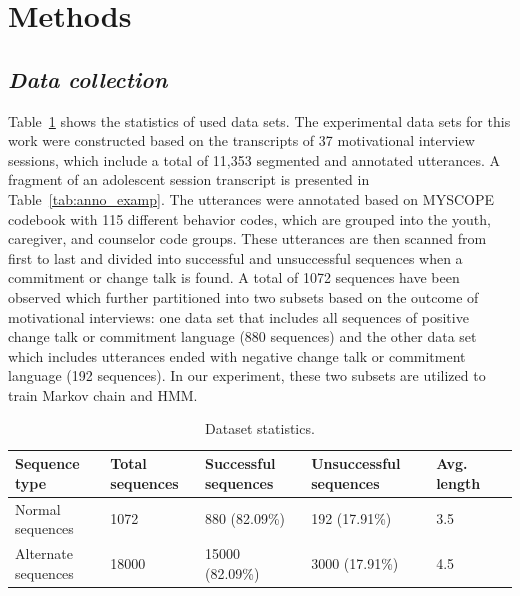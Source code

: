 \documentclass{amia}
\begin{document}
\section*{Methods}
\subsection*{\textit{Data collection}}
Table~\ref{tab:data_dist} shows the statistics of used data sets. The experimental data sets for this work were constructed based on the transcripts of 37 motivational interview sessions, which include a total of 11,353 segmented and annotated utterances. A fragment of an adolescent session transcript is presented in Table~\ref{tab:anno_examp}. The utterances were annotated based on MYSCOPE codebook \cite{carcone2013provider} with 115 different behavior codes, which are grouped into the youth, caregiver, and counselor code groups. These utterances are then scanned from first to last and divided into successful and unsuccessful sequences when a commitment or change talk is found. A total of 1072 sequences have been observed which further partitioned into two subsets based on the outcome of motivational interviews: one data set that includes all sequences of positive change talk or commitment language (880 sequences) and the other data set which includes utterances ended with negative change talk or commitment language (192 sequences). In our experiment, these two subsets are utilized to train Markov chain and HMM. \\

\begin{table}[h]
\centering
\caption{Dataset statistics.}
\label{tab:data_dist}
  \begin{tabular}{|l|l|l|l|l|l|}
  \hline
   \textbf{Sequence type} & \textbf{Total sequences}  & \textbf{Successful sequences}  & \textbf{Unsuccessful sequences} & \textbf{Avg. length} \\ \hline      
 Normal sequences & 1072 & 880 (82.09\%) & 192 (17.91\%) & 3.5 \\\hline
Alternate sequences & 18000 & 15000 (82.09\%) & 3000 (17.91\%) & 4.5 \\\hline 
  \end{tabular}
\end{table} 
\end{document}
